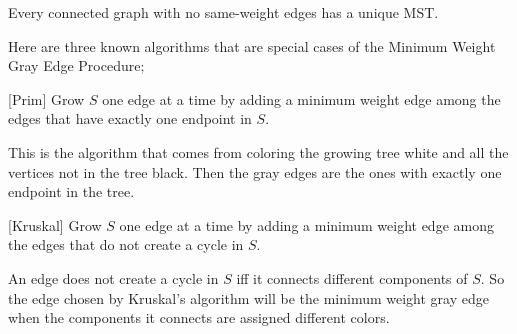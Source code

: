 \begin{corollary}\label{cor:uniqMST}
Every connected graph with no same-weight edges has a unique MST.
\end{corollary}

Here are three known algorithms that are special cases of the Minimum
Weight Gray Edge Procedure;

\begin{algorithm}\label{alg:MST1}[Prim]
  Grow $S$ one edge at a time by adding a minimum weight edge
  among the edges that have exactly one endpoint in $S$.
\end{algorithm}

This is the algorithm that comes from coloring the growing tree white
and all the vertices not in the tree black.  Then the gray edges are
the ones with exactly one endpoint in the tree.

\begin{algorithm}\label{alg:MST2}[Kruskal]
  Grow $S$ one edge at a time by adding a minimum weight edge among
  the edges that do not create a cycle in $S$.
\end{algorithm}

An edge does not create a cycle in $S$ iff it connects different
components of $S$.  So the edge chosen by Kruskal's algorithm will be
the minimum weight gray edge when the components it connects are
assigned different colors.

